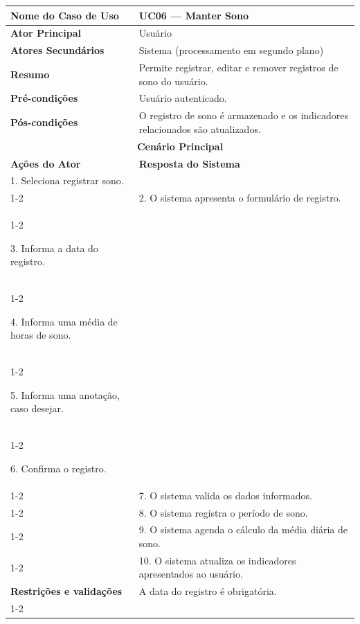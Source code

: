 
\begin{longtable}{| p{} | p{} |}
\hline

\textbf{Nome do Caso de Uso} &
UC06 --- Manter Sono \\
\hline

\textbf{Ator Principal} &
Usuário \\
\hline

\textbf{Atores Secundários} &
Sistema (processamento em segundo plano) \\
\hline

\textbf{Resumo} &
Permite registrar, editar e remover registros de sono do usuário. \\
\hline

\textbf{Pré-condições} &
Usuário autenticado. \\
\hline

\textbf{Pós-condições} &
O registro de sono é armazenado e os indicadores relacionados são atualizados. \\
\hline

\multicolumn{2}{|c|}{\textbf{Cenário Principal}}\\
\hline

\textbf{Ações do Ator} &
\textbf{Resposta do Sistema} \\
\hline

1. Seleciona registrar sono. & \\
\cline{1-2}

&
2. O sistema apresenta o formulário de registro. \\
\cline{1-2}

3. Informa a data do registro. &
\\
\cline{1-2}

4. Informa uma média de horas de sono. &
\\
\cline{1-2}

5. Informa uma anotação, caso desejar. &
\\
\cline{1-2}

6. Confirma o registro. & \\
\cline{1-2}

& 7. O sistema valida os dados informados. \\
\cline{1-2}

& 8. O sistema registra o período de sono. \\
\cline{1-2}

& 9. O sistema agenda o cálculo da média diária de sono. \\
\cline{1-2}

& 10. O sistema atualiza os indicadores apresentados ao usuário. \\
\hline

\multirow{1}{.40\textwidth}{\textbf{Restrições e validações}}
&
A data do registro é obrigatória. \\
\cline{1-2}
\hline

\end{longtable}
